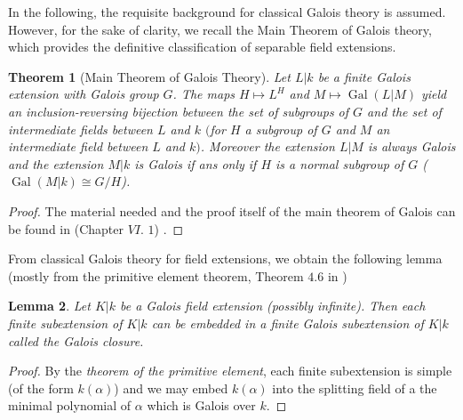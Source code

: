 \documentclass{article}
\theoremstyle{plain}
\newtheorem{theorem}{Theorem}[subsection]
\newtheorem{lemma}[theorem]{Lemma}
\theoremstyle{definition}
\DeclareMathOperator{\Gal}{Gal}
\begin{document}
\noindent In the following, the requisite background for classical Galois theory is assumed. 
However, for the sake of clarity, we recall the Main Theorem of Galois theory, which provides the definitive classification of separable field extensions.


\begin{theorem}[Main Theorem of Galois Theory]
\label{galois_finite_field}
    Let $L|k$ be a finite Galois extension with Galois group $G$. The maps $H\mapsto L^{H}$ and $M \mapsto \Gal(L|M)$ yield an inclusion-reversing bijection between the set of subgroups of $G$ and the set of intermediate fields between $L$ and $k$ $($for $H$ a subgroup of $G$ and $M$ an intermediate field between $L$ and $k)$. Moreover
    the extension $L|M$ is always Galois and 
    the extension $M|k$ is Galois if ans only if $H$ is a normal subgroup of $G$ ($\Gal(M|k)\cong G/H$).
\end{theorem}
\begin{proof}
    The material needed and the proof itself of the main theorem of Galois can be found in \cite{Lang_algebra} (Chapter $VI.$ $1$) .
\end{proof}

\noindent From classical Galois theory for field extensions, we obtain the following lemma (mostly from the primitive element theorem, Theorem $4.6$ in \cite{Lang_algebra})

\begin{lemma}
\label{embed_finite_subextension}
    Let $K|k$ be a Galois field extension (possibly infinite). Then each finite subextension of $K|k$ can be embedded in a finite Galois subextension of $K|k$ called the Galois closure.
\end{lemma}
\begin{proof}
    By the \textit{theorem of the primitive element}, each finite subextension is simple (of the form $k(\alpha)$) and we may embed $k(\alpha)$ into the splitting field of a the minimal polynomial of $\alpha$ which is Galois over $k$.
\end{proof}
\end{document}
